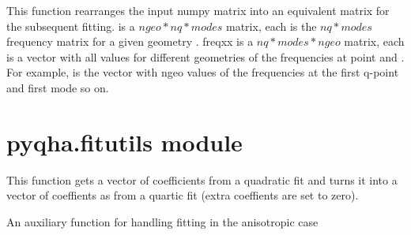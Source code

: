 \documentclass[letterpaper,10pt,english]{sphinxmanual}
\begin{document}
\begin{fulllineitems}
\label{pyqha:pyqha.fitfreqgrun.rearrange_freqx}
This function rearranges the input numpy matrix  into an equivalent 
matrix  for the subsequent fitting.
 is a \(ngeo*nq*modes\) matrix, each  is the \(nq*modes\)
frequency matrix for a given geometry .
freqxx is a \(nq*modes*ngeo\) matrix, each  is a vector with
all values for different geometries of the frequencies at point  and .
For example,  is the vector with ngeo values of the frequencies
at the first q-point and first mode so on.

\end{fulllineitems}



\section{pyqha.fitutils module}
\label{pyqha:pyqha-fitutils-module}\label{pyqha:module-pyqha.fitutils}

\begin{fulllineitems}
\label{pyqha:pyqha.fitutils.expand_quadratic_to_quartic}
This function gets a vector of coefficients from a quadratic fit and turns it
into a vector of coeffients as from a quartic fit (extra coeffients are set to zero).

\end{fulllineitems}


\begin{fulllineitems}
\label{pyqha:pyqha.fitutils.fit_anis}
An auxiliary function for handling fitting in the anisotropic case

\end{fulllineitems}
\end{document}
